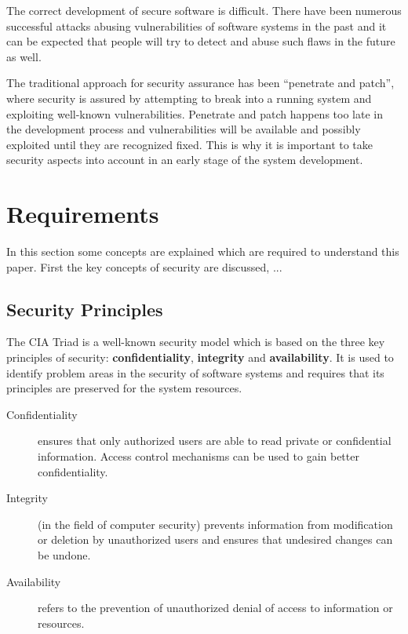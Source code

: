 \documentclass{acmtog} %
\begin{document}
The correct development of secure software is difficult.
There have been numerous successful attacks abusing vulnerabilities of software systems in the past and it can be expected that people will try to detect and abuse such flaws in the future as well.

The traditional approach for security assurance has been ``penetrate and patch'', where security is assured by attempting to break into a running system and exploiting well-known vulnerabilities.
Penetrate and patch happens too late in the development process and vulnerabilities will be available and possibly exploited  until they are recognized fixed.
This is why it is important to take security aspects into account in an early stage of the system development.


\section{Requirements}
\label{sec:requirements}

In this section some concepts are explained which are required to understand this paper.
First the key concepts of security are discussed, ...

\subsection{Security Principles}

The CIA Triad is a well-known security model which is based on the three key principles of security: \textbf{confidentiality}, \textbf{integrity} and \textbf{availability}.
It is used to identify problem areas in the security of software systems and requires that its principles are preserved for the system resources.

\begin{description}
	\item[Confidentiality]
		ensures that only authorized users are able to read private or confidential information.
		Access control mechanisms can be used to gain better confidentiality.
	\item[Integrity]
		(in the field of computer security) prevents information from modification or deletion by unauthorized users and ensures that undesired changes can be undone.
	\item[Availability]
		refers to the prevention of unauthorized denial of access to information or resources.
\end{description}
\end{document}
